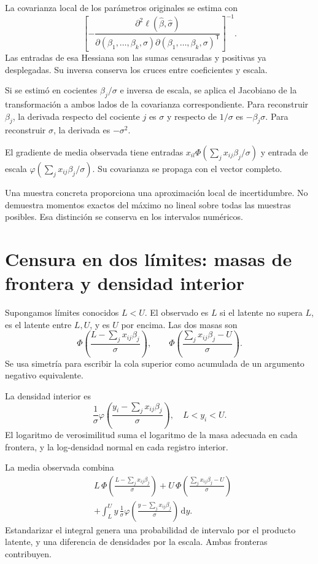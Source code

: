 \documentclass[11pt,a4paper]{article}
\newcommand{\T}{^{\mathsf T}}
\newcommand{\dd}{\,\mathrm d}
\begin{document}
La covarianza local de los
parámetros originales se estima con
\[
\left[
-\frac{\partial^2\ell(\widehat\beta,\widehat\sigma)}
{\partial(\beta_1,\ldots,\beta_k,\sigma)
\partial(\beta_1,\ldots,\beta_k,\sigma)\T}
\right]^{-1}.
\]
Las entradas de esa Hessiana
son las sumas censuradas
y positivas ya desplegadas.
Su inversa conserva los
cruces entre coeficientes y escala.

Si se estimó en cocientes
\(\beta_j/\sigma\) e inversa de escala,
se aplica el Jacobiano de la
transformación a ambos lados
de la covarianza correspondiente.
Para reconstruir \(\beta_j\),
la derivada respecto del
cociente \(j\) es \(\sigma\)
y respecto de \(1/\sigma\)
es \(-\beta_j\sigma\).
Para reconstruir \(\sigma\),
la derivada es \(-\sigma^2\).

\begin{ejemplo}
El gradiente de media observada tiene
entradas \(x_{il}\Phi(\sum_jx_{ij}\beta_j/\sigma)\)
y entrada de escala
\(\varphi(\sum_jx_{ij}\beta_j/\sigma)\).
Su covarianza se propaga
con el vector completo.
\end{ejemplo}
Una muestra concreta proporciona
una aproximación local de incertidumbre.
No demuestra momentos exactos
del máximo no lineal sobre
todas las muestras posibles.
Esa distinción se conserva
en los intervalos numéricos.

\clearpage
\section{Censura en dos límites: masas de frontera y densidad interior}\label{unidad103}
Supongamos límites conocidos \(L<U\).
El observado es \(L\) si el
latente no supera \(L\),
es el latente entre \(L,U\),
y es \(U\) por encima.
Las dos masas son
\[
\Phi\left(\frac{L-\sum_jx_{ij}\beta_j}{\sigma}\right),
\qquad
\Phi\left(\frac{\sum_jx_{ij}\beta_j-U}{\sigma}\right).
\]
Se usa simetría para escribir
la cola superior como acumulada
de un argumento negativo equivalente.

La densidad interior es
\[
\frac1\sigma\varphi\left(
\frac{y_i-\sum_jx_{ij}\beta_j}{\sigma}\right),
\quad L<y_i<U.
\]
El logaritmo de verosimilitud
suma el logaritmo de la
masa adecuada en cada frontera,
y la log-densidad normal en
cada registro interior.

La media observada combina
\[
\begin{aligned}
&L\,\Phi\left(\frac{L-\sum_jx_{ij}\beta_j}{\sigma}\right)
+U\,\Phi\left(\frac{\sum_jx_{ij}\beta_j-U}{\sigma}\right)\\
&+\int_L^U y\,\frac1\sigma
\varphi\left(\frac{y-\sum_jx_{ij}\beta_j}{\sigma}\right)\dd y.
\end{aligned}
\]
Estandarizar el integral genera
una probabilidad de intervalo
por el producto latente,
y una diferencia de densidades
por la escala.
Ambas fronteras contribuyen.
\end{document}
